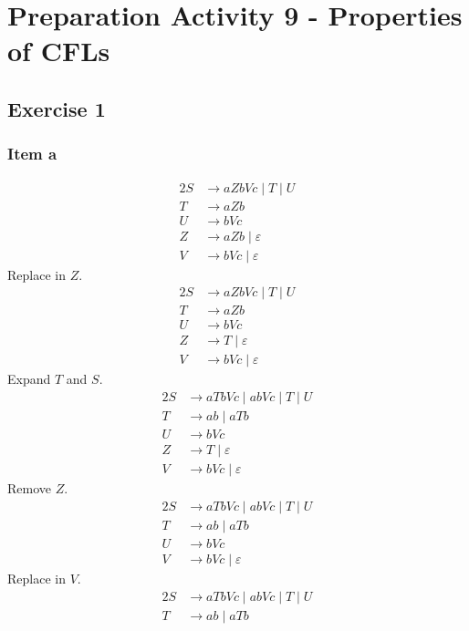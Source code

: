 \setcounter{section}{8}
\section{Preparation Activity 9 - Properties of CFLs}
{
\renewcommand{\thesubsubsection}{\thesubsection\alph{subsubsection}}
\subsection{Exercise 1}
\subsubsection{Item a}
\begin{alignat*}{2}
	S &\rightarrow aZbVc\;|\;T\;|\;U\\
	T &\rightarrow aZb\\
	U &\rightarrow bVc\\
	Z &\rightarrow aZb\;|\;\varepsilon \\
	V &\rightarrow bVc\;|\;\varepsilon
\end{alignat*}
Replace in $Z$.
\begin{alignat*}{2}
	S &\rightarrow aZbVc\;|\;T\;|\;U\\
	T &\rightarrow aZb\\
	U &\rightarrow bVc\\
	Z &\rightarrow T\;|\;\varepsilon \\
	V &\rightarrow bVc\;|\;\varepsilon
\end{alignat*}
Expand $T$ and $S$.
\begin{alignat*}{2}
	S &\rightarrow aTbVc\;|\;abVc\;|\;T\;|\;U\\
	T &\rightarrow ab\;|\;aTb\\
	U &\rightarrow bVc\\
	Z &\rightarrow T\;|\;\varepsilon \\
	V &\rightarrow bVc\;|\;\varepsilon
\end{alignat*}
Remove $Z$.
\begin{alignat*}{2}
	S &\rightarrow aTbVc\;|\;abVc\;|\;T\;|\;U\\
	T &\rightarrow ab\;|\;aTb\\
	U &\rightarrow bVc\\
	V &\rightarrow bVc\;|\;\varepsilon
\end{alignat*}
Replace in $V$.
\begin{alignat*}{2}
	S &\rightarrow aTbVc\;|\;abVc\;|\;T\;|\;U\\
	T &\rightarrow ab\;|\;aTb\\

\end{alignat*}}
